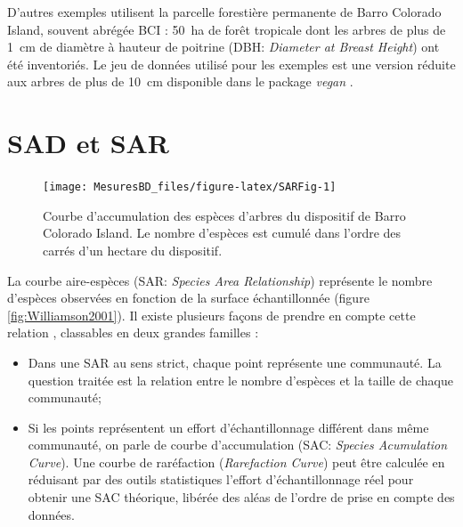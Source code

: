 \documentclass[
  11pt,
  french,
  a4paper,
  extrafontsizes,onecolumn,openright
  ]{memoir}
\providecommand{\tightlist}{%
  \setlength{\itemsep}{0pt}\setlength{\parskip}{0pt}}
\begin{document}
D'autres exemples utilisent la parcelle forestière permanente de Barro Colorado Island, souvent abrégée BCI \autocite{Condit2012}: 50~ha de forêt tropicale dont les arbres de plus de 1~cm de diamètre à hauteur de poitrine (DBH: \emph{Diameter at Breast Height}) ont été inventoriés.
Le jeu de données utilisé pour les exemples est une version réduite aux arbres de plus de 10~cm disponible dans le package \emph{vegan} \autocite{Oksanen2012}.

\hypertarget{sad-et-sar}{%
\section{SAD et SAR}\label{sad-et-sar}}



\scriptsize

\begin{figure}

{\centering \texttt{[image: MesuresBD\_files/figure-latex/SARFig-1]} 

}

\caption{Courbe d'accumulation des espèces d'arbres du dispositif de Barro Colorado Island. Le nombre d'espèces est cumulé dans l'ordre des carrés d'un hectare du dispositif.}\label{fig:SARFig}
\end{figure}

\normalsize

La courbe aire-espèces (SAR: \emph{Species Area Relationship}) représente le nombre d'espèces observées en fonction de la surface échantillonnée (figure \ref{fig:Williamson2001}).
Il existe plusieurs façons de prendre en compte cette relation \autocite{Scheiner2003}, classables en deux grandes familles \autocite{Dengler2009}:

\begin{itemize}
\tightlist
\item
  Dans une SAR au sens strict, chaque point représente une communauté.
  La question traitée est la relation entre le nombre d'espèces et la taille de chaque communauté;
\item
  Si les points représentent un effort d'échantillonnage différent dans même communauté, on parle de courbe d'accumulation (SAC: \emph{Species Acumulation Curve}). Une courbe de raréfaction (\emph{Rarefaction Curve}) peut être calculée en réduisant par des outils statistiques l'effort d'échantillonnage réel pour obtenir une SAC théorique, libérée des aléas de l'ordre de prise en compte des données.
\end{itemize}
\end{document}
